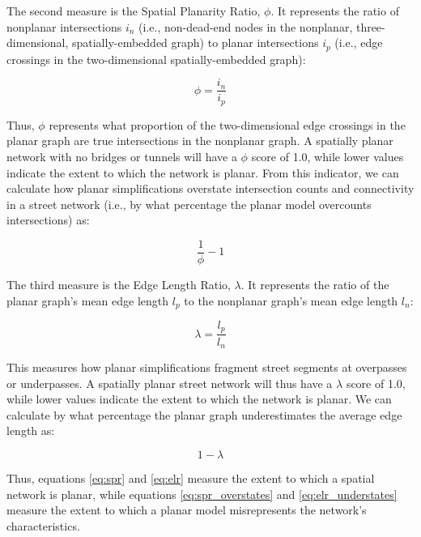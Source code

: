 \documentclass[Afour,sageh,times]{sagej}
\begin{document}
The second measure is the Spatial Planarity Ratio, $\phi$. It represents the ratio of nonplanar intersections $i_n$ (i.e., non-dead-end nodes in the nonplanar, three-dimensional, spatially-embedded graph) to planar intersections $i_p$ (i.e., edge crossings in the two-dimensional spatially-embedded graph): 

\begin{equation}
	\label{eq:spr}
	\phi = \frac{i_n}{i_p}
\end{equation}

Thus, $\phi$ represents what proportion of the two-dimensional edge crossings in the planar graph are true intersections in the nonplanar graph. A spatially planar network with no bridges or tunnels will have a $\phi$ score of 1.0, while lower values indicate the extent to which the network is planar. From this indicator, we can calculate how planar simplifications overstate intersection counts and connectivity in a street network (i.e., by what percentage the planar model overcounts intersections) as:

\begin{equation}
	\label{eq:spr_overstates}
	\frac{1}{\phi} - 1
\end{equation}

The third measure is the Edge Length Ratio, $\lambda$. It represents the ratio of the planar graph's mean edge length $l_p$ to the nonplanar graph's mean edge length $l_n$:

\begin{equation}
	\label{eq:elr}
	\lambda = \frac{l_p}{l_n}
\end{equation}

This measures how planar simplifications fragment street segments at overpasses or underpasses. A spatially planar street network will thus have a $\lambda$ score of 1.0, while lower values indicate the extent to which the network is planar. We can calculate by what percentage the planar graph underestimates the average edge length as:

\begin{equation}
	\label{eq:elr_understates}
	1 - \lambda
\end{equation}

Thus, equations \ref{eq:spr} and \ref{eq:elr} measure the extent to which a spatial network is planar, while equations \ref{eq:spr_overstates} and \ref{eq:elr_understates} measure the extent to which a planar model misrepresents the network's characteristics.
\end{document}
